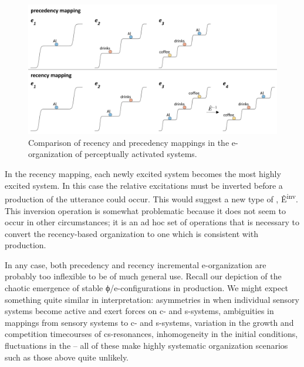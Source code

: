   
\begin{figure}
\includegraphics[width=\textwidth]{figures/Tilsen-img128.png}
\caption{Comparison of recency and precedency mappings in the e-or\-ga\-ni\-za\-tion of perceptually activated systems.}
\label{fig:6:9}
\end{figure}
 

  In the recency mapping, each newly excited system becomes the most highly excited system. In this case the relative excitations must be inverted before a production of the utterance could occur. This would suggest a new type of , Ê\textsuperscript{{}inv}. This inversion operation is somewhat problematic because it does not seem to occur in other circumstances; it is an ad hoc set of operations that is necessary to convert the recency-based organization to one which is consistent with production.

  In any case, both precedency and recency incremental e-or\-ga\-ni\-za\-tion are probably too inflexible to be of much general use. Recall our depiction of the chaotic emergence of stable ϕ/e-con\-fi\-gu\-ra\-tions in production. We might expect something quite similar in interpretation: asymmetries in when individual sensory systems become active and exert forces on c- and s-sys\-tems, ambiguities in mappings from sensory systems to c- and s-sys\-tems, variation in the growth and competition timecourses of cs-resonances, inhomogeneity in the initial conditions, fluctuations in the  -- all of these make highly systematic organization scenarios such as those above quite unlikely.

